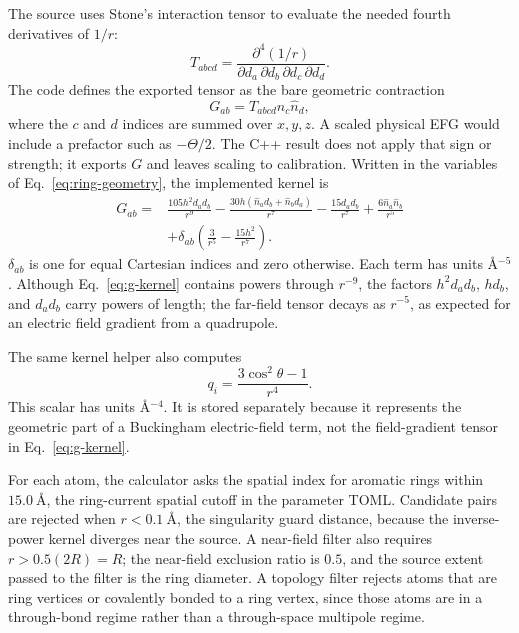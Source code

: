 \documentclass[11pt]{article}
\begin{document}
The source uses Stone's interaction tensor to evaluate the needed fourth
derivatives of \(1/r\):
\[
  T_{abcd} =
  \frac{\partial^4(1/r)}
       {\partial d_a\,\partial d_b\,\partial d_c\,\partial d_d}.
\]
The code defines the exported tensor as the bare geometric contraction
\begin{equation}
  G_{ab}=T_{abcd}\hat n_c\hat n_d ,
  \label{eq:g-definition}
\end{equation}
where the \(c\) and \(d\) indices are summed over \(x,y,z\). A scaled physical
EFG would include a prefactor such as \(-\Theta/2\). The C++ result does not
apply that sign or strength; it exports \(G\) and leaves scaling to calibration.
Written in the variables of Eq.~\eqref{eq:ring-geometry}, the implemented
kernel is
\begin{align}
  G_{ab}={}&
  \frac{105h^2 d_a d_b}{r^9}
  -\frac{30h(\hat n_a d_b+\hat n_b d_a)}{r^7}
  -\frac{15d_a d_b}{r^7}
  +\frac{6\hat n_a\hat n_b}{r^5} \nonumber\\
  &+\delta_{ab}\left(\frac{3}{r^5}-\frac{15h^2}{r^7}\right).
  \label{eq:g-kernel}
\end{align}
\(\delta_{ab}\) is one for equal Cartesian indices and zero otherwise. Each
term has units \(\si{\angstrom^{-5}}\). Although Eq.~\eqref{eq:g-kernel}
contains powers through \(r^{-9}\), the factors \(h^2d_ad_b\), \(hd_b\), and
\(d_ad_b\) carry powers of length; the far-field tensor decays as
\(r^{-5}\), as expected for an electric field gradient from a quadrupole.

The same kernel helper also computes
\begin{equation}
  q_i = \frac{3\cos^2\theta-1}{r^4}.
  \label{eq:scalar}
\end{equation}
This scalar has units \(\si{\angstrom^{-4}}\). It is stored separately because
it represents the geometric part of a Buckingham electric-field term, not the
field-gradient tensor in Eq.~\eqref{eq:g-kernel}.

For each atom, the calculator asks the spatial index for aromatic rings within
\(\SI{15.0}{\angstrom}\), the ring-current spatial cutoff in the parameter
TOML. Candidate pairs are rejected when \(r<\SI{0.1}{\angstrom}\), the
singularity guard distance, because the inverse-power kernel diverges near the
source. A near-field filter also requires \(r>0.5(2R)=R\); the near-field
exclusion ratio is \(0.5\), and the source extent passed to the filter is the
ring diameter. A topology filter rejects atoms that are ring vertices or
covalently bonded to a ring vertex, since those atoms are in a through-bond
regime rather than a through-space multipole regime.
\end{document}
